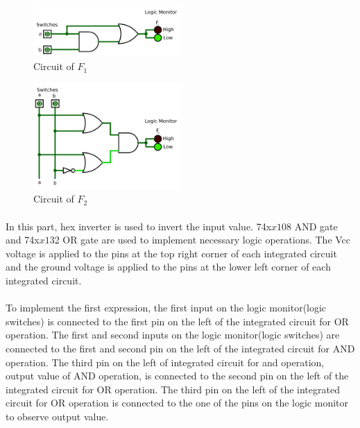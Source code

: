 \documentclass[pdftex,12pt,a4paper]{article}
\begin{document}
\begin{flushleft}
\begin{figure}[!h]
	\centering
	\includegraphics[width=0.5\textwidth]{part1-f1.png}	
	\caption{Circuit of $F_1$}
	\label{fig1}
\end{figure}


\begin{figure}[!h]
	\centering
	\includegraphics[width=0.5\textwidth]{part1-f2.png}	
	\caption{Circuit of $F_2$}
	\label{fig1}
\end{figure}
\begin{flushleft}

\end{flushleft}
\paragraph{}
In this part, hex inverter is used to invert the input value. 74x$x{1}$08 AND gate and 74x$x{1}$32 OR gate are used to implement necessary logic operations. The Vcc voltage is applied to the pins at the top right corner of each  integrated circuit and the ground voltage is applied to the pins at the lower left corner of each integrated circuit. 

\paragraph{}
To implement the first expression, the first input on the logic monitor(logic switches) is connected to the first pin on the left of the integrated circuit for OR operation. The first and second inputs on the logic monitor(logic switches) are connected to the first and second pin on the left of the integrated circuit for AND operation. The third pin on the left of integrated circuit for and operation, output value of AND operation, is connected to the second pin on the left of the integrated circuit for OR operation. The third pin on the left of the integrated circuit for OR operation is connected to the one of the pins on the logic monitor to observe output value.


\end{flushleft}
\end{document}
